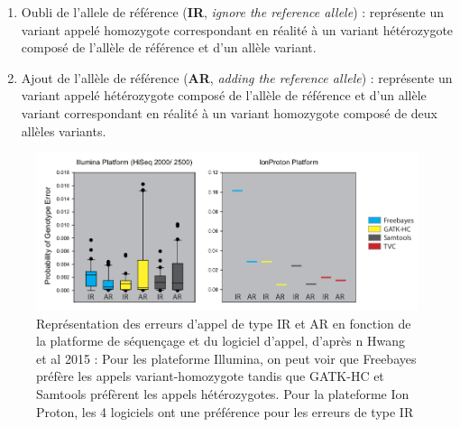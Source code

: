 \documentclass[12pt,twoside]{reedthesis}
\providecommand{\tightlist}{%
  \setlength{\itemsep}{0pt}\setlength{\parskip}{0pt}}
\theoremstyle{definition}
\theoremstyle{definition}
\theoremstyle{remark}
\begin{document}
  \begin{enumerate}
  \def\labelenumi{\arabic{enumi}.}
  \tightlist
  \item
    Oubli de l'allele de référence (\textbf{IR}, \emph{ignore the
    reference allele}) : représente un variant appelé homozygote
    correspondant en réalité à un variant hétérozygote composé de l'allèle
    de référence et d'un allèle variant.\\
  \item
    Ajout de l'allèle de référence (\textbf{AR}, \emph{adding the
    reference allele}) : représente un variant appelé hétérozygote composé
    de l'allèle de référence et d'un allèle variant correspondant en
    réalité à un variant homozygote composé de deux allèles variants.\\
  \end{enumerate}
  
  \begin{figure}
  
  {\centering \includegraphics[scale=.50]{figure/snp_error_type} 
  
  }
  
  \caption[Représentation des erreurs d'appel de type IR et AR en fonction de la platforme de séquençage et du logiciel d'appel, d'après n Hwang et al 2015]{Représentation des erreurs d'appel de type IR et AR en fonction de la platforme de séquençage et du logiciel d'appel, d'après n Hwang et al 2015 : Pour les plateforme Illumina, on peut voir que Freebayes préfère les appels variant-homozygote tandis que GATK-HC et Samtools préfèrent les appels hétérozygotes. Pour la plateforme Ion Proton, les 4 logiciels ont une préférence pour les erreurs de type IR}\label{fig:snperror}
  \end{figure}
  
\end{document}
